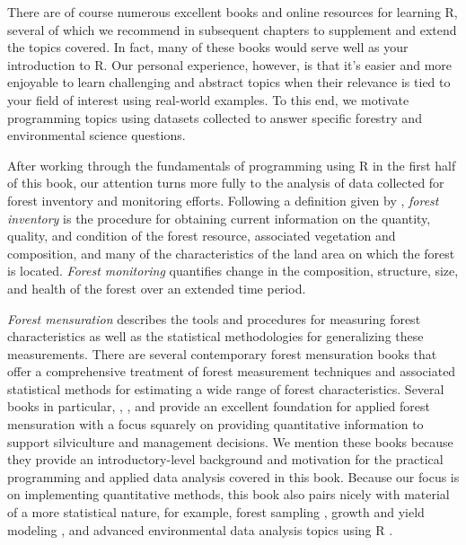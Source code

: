 \documentclass[
  11pt,
]{krantz}
\theoremstyle{definition}
\theoremstyle{definition}
\theoremstyle{definition}
\theoremstyle{definition}
\theoremstyle{remark}
\begin{document}
There are of course numerous excellent books and online resources for learning R, several of which we recommend in subsequent chapters to supplement and extend the topics covered. In fact, many of these books would serve well as your introduction to R. Our personal experience, however, is that it's easier and more enjoyable to learn challenging and abstract topics when their relevance is tied to your field of interest using real-world examples. To this end, we motivate programming topics using datasets collected to answer specific forestry and environmental science questions.

After working through the fundamentals of programming using R in the first half of this book, our attention turns more fully to the analysis of data collected for forest inventory and monitoring efforts. Following a definition given by \citet{kershaw2016}, \emph{forest inventory} is the procedure for obtaining current information on the quantity, quality, and condition of the forest resource, associated vegetation and composition, and many of the characteristics of the land area on which the forest is located. \emph{Forest monitoring} quantifies change in the composition, structure, size, and health of the forest over an extended time period.

\emph{Forest mensuration} describes the tools and procedures for measuring forest characteristics as well as the statistical methodologies for generalizing these measurements. There are several contemporary forest mensuration books that offer a comprehensive treatment of forest measurement techniques and associated statistical methods for estimating a wide range of forest characteristics. Several books in particular, \citet{van2007}, \citet{kershaw2016}, and \citet{burkhart2018} provide an excellent foundation for applied forest mensuration with a focus squarely on providing quantitative information to support silviculture and management decisions. We mention these books because they provide an introductory-level background and motivation for the practical programming and applied data analysis covered in this book. Because our focus is on implementing quantitative methods, this book also pairs nicely with material of a more statistical nature, for example, forest sampling \citep{gregoire2007, mandallaz2007}, growth and yield modeling \citep{weiskittel2011}, and advanced environmental data analysis topics using R \citep{robinson2011, mehtatalo2020, green2020}.
\end{document}
